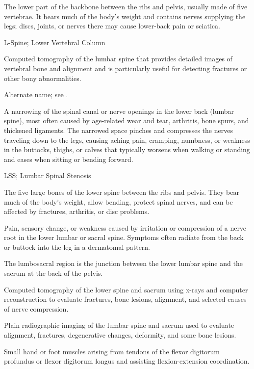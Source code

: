  The lower part of the backbone between the ribs and pelvis, usually made of five vertebrae. It bears much of the body’s weight and contains nerves supplying the legs; discs, joints, or nerves there may cause lower-back pain or sciatica.

\synonyms
L-Spine; Lower Vertebral Column

 Computed tomography of the lumbar spine that provides detailed images of vertebral bone and alignment and is particularly useful for detecting fractures or other bony abnormalities.

 Alternate name; see .

 A narrowing of the spinal canal or nerve openings in the lower back (lumbar spine), most often caused by age-related wear and tear, arthritis, bone spurs, and thickened ligaments. The narrowed space pinches and compresses the nerves traveling down to the legs, causing aching pain, cramping, numbness, or weakness in the buttocks, thighs, or calves that typically worsens when walking or standing and eases when sitting or bending forward.

\synonyms
LSS; Lumbar Spinal Stenosis

 The five large bones of the lower spine between the ribs and pelvis. They bear much of the body’s weight, allow bending, protect spinal nerves, and can be affected by fractures, arthritis, or disc problems.

 Pain, sensory change, or weakness caused by irritation or compression of a nerve root in the lower lumbar or sacral spine. Symptoms often radiate from the back or buttock into the leg in a dermatomal pattern.

 The lumbosacral region is the junction between the lower lumbar spine and the sacrum at the back of the pelvis.

 Computed tomography of the lower spine and sacrum using x-rays and computer reconstruction to evaluate fractures, bone lesions, alignment, and selected causes of nerve compression.

 Plain radiographic imaging of the lumbar spine and sacrum used to evaluate alignment, fractures, degenerative changes, deformity, and some bone lesions.

 Small hand or foot muscles arising from tendons of the flexor digitorum profundus or flexor digitorum longus and assisting flexion-extension coordination.


